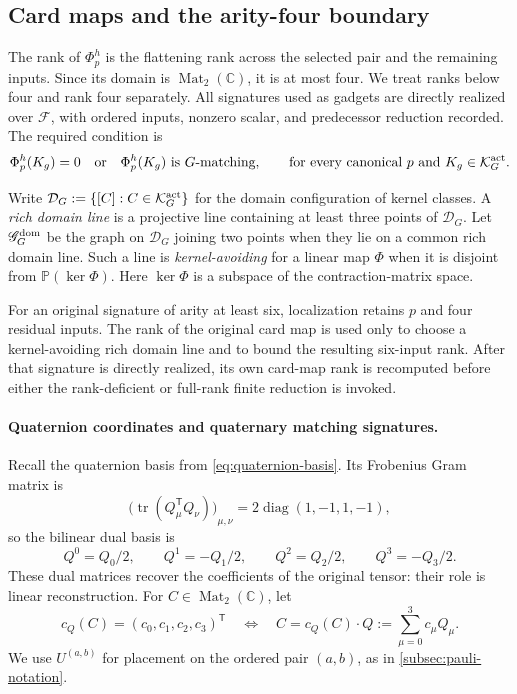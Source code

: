 \documentclass[11pt,letterpaper,onecolumn]{article}
\theoremstyle{plain}
\theoremstyle{definition}
\theoremstyle{remark}
\newcommand{\cF}{\mathcal F}
\newcommand{\Mat}{\operatorname{Mat}}
\newcommand{\diag}{\operatorname{diag}}
\begin{document}
\subsection{Card maps and the arity-four boundary}



The rank of \(\Phi_p^h\) is the flattening rank across the selected pair
and the remaining inputs.  Since its domain is \(\Mat_2(\mathbb C)\), it is
at most four.  We treat ranks below four and rank four separately.  All signatures used as gadgets are directly realized
over \(\cF\), with ordered inputs, nonzero scalar, and predecessor
reduction recorded.  The required condition is
\begin{equation}
 \Phi_p^h(K_g)=0\quad\text{or}\quad\Phi_p^h(K_g)\text{ is \(G\)-matching},
 \qquad \text{for every canonical \(p\) and \(K_g\in\mathcal K_G^{\rm act}\)}.
 \label{eq:platonic-all-card-condition}
\end{equation}

Write
\(\mathcal D_G:=\{[C]:C\in\mathcal K_G^{\rm act}\}\) for the domain
configuration of kernel classes.  A \emph{rich
domain line} is a projective line containing at least three points of
\(\mathcal D_G\).  Let \(\mathscr G_G^{\rm dom}\) be the graph on
\(\mathcal D_G\) joining two points when they lie on a common rich domain
line.  Such a line is \emph{kernel-avoiding} for a linear map \(\Phi\) when
it is disjoint from \(\mathbb P(\ker\Phi)\).  Here \(\ker\Phi\) is a subspace of the contraction-matrix space.  

For an original signature of arity at least six, localization retains \(p\) and four
residual inputs.  The rank of the original card map is used only to choose a
kernel-avoiding rich domain line and to bound the resulting six-input rank.  After
that signature is directly realized, its own card-map rank is
recomputed before either the rank-deficient or full-rank finite reduction is
invoked.

\paragraph{Quaternion coordinates and quaternary matching signatures.}

Recall the quaternion basis from \cref{eq:quaternion-basis}.  Its
Frobenius Gram matrix is
\begin{equation*}
  {\bigl(\operatorname{tr}(Q_\mu^{\mathsf T}Q_\nu)\bigr)}_{\mu,\nu}
  =2\diag(1,-1,1,-1),
\end{equation*}
so the bilinear dual basis is
\begin{equation}
  Q^0=Q_0/2,\qquad Q^1=-Q_1/2,\qquad
  Q^2=Q_2/2,\qquad Q^3=-Q_3/2.
  \label{eq:platonic-dual-basis}
\end{equation}
These dual matrices recover the coefficients of the original tensor:
their role is linear reconstruction.  For \(C\in\Mat_2(\mathbb C)\), let
\[
 c_Q(C)=(c_0,c_1,c_2,c_3)^{\mathsf T}
 \quad\Longleftrightarrow\quad
 C=c_Q(C)\mathbin{\cdot}Q:=\sum_{\mu=0}^3c_\mu Q_\mu.
\]
We use \(U^{(a,b)}\) for placement on the ordered pair \((a,b)\), as in \cref{subsec:pauli-notation}.
\end{document}
